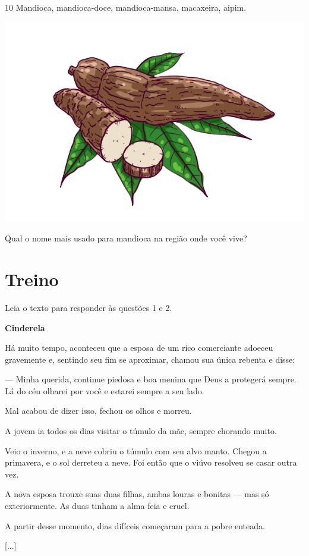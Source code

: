 \num{10} Mandioca, mandioca-doce, mandioca-mansa, macaxeira, aipim. 
\begin{center}
\includegraphics[width=.6\textwidth]{./media/image19b.png}
\end{center}

Qual o nome mais usado para mandioca na região onde você vive?


\section*{Treino}

Leia o texto para responder às questões 1 e 2.

\begin{myquote}
\textbf{Cinderela}

Há muito tempo, aconteceu que a esposa de um rico
comerciante adoeceu gravemente e, sentindo seu fim se
aproximar, chamou sua única rebenta e disse:

--- Minha querida, continue piedosa e boa menina que
Deus a protegerá sempre. Lá do céu olharei por você e estarei
sempre a seu lado.

Mal acabou de dizer isso, fechou os olhos e morreu.

A jovem ia todos os dias visitar o túmulo da mãe,
sempre chorando muito.

Veio o inverno, e a neve cobriu o túmulo com seu alvo
manto. Chegou a primavera, e o sol derreteu a neve. Foi então
que o viúvo resolveu se casar outra vez.

A nova esposa trouxe suas duas filhas, ambas louras e
bonitas --- mas só exteriormente. As duas tinham a alma feia
e cruel.

A partir desse momento, dias difíceis começaram para
a pobre enteada.

{[}...{]}

\end{myquote}

